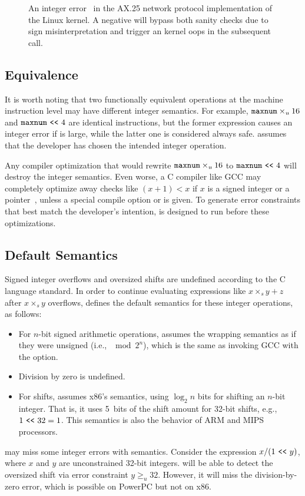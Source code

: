 \begin{figure}
\centering

\vspace{-1em}
\caption{An integer error~\cite[CVE-2009-2909]{cve} in the AX.25
network protocol implementation of the Linux kernel.  A negative
 will bypass both sanity checks due to sign misinterpretation
 and trigger an kernel
oops in the subsequent  call.}
\label{f:ax25-sign}
\end{figure}

\subsection{Equivalence}

It is worth noting that two functionally equivalent operations at
the machine instruction level may have different integer semantics.
For example, $\texttt{maxnum}\times_u 16$ and $\texttt{maxnum} \ \texttt{<}\texttt{<}\  4$ are
identical instructions, but the former expression causes an integer
error if  is large, while the latter one is considered
always safe.  \sys assumes that the developer has chosen the
intended integer operation.

Any compiler optimization that would rewrite
$\texttt{maxnum}\times_u 16$ to $\texttt{maxnum} \ \texttt{<}\texttt{<}\  4$ will destroy the
integer semantics.  Even worse, a C compiler like GCC may completely
optimize away checks like $(x + 1) < x$ if $x$ is a signed integer
or a pointer~\cite{gcc:signed-overflow,us-cert:gcc}, unless a special
compile option  or  is given.
To generate error constraints that best match the developer's
intention, \sys is designed to run before these optimizations.

\subsection{Default Semantics}
\label{s:sema:def}

Signed integer overflows and oversized shifts are undefined according
to the C language standard.  In order to continue evaluating
expressions like $x \times_s y + z$ after $x \times_s y$ overflows,
\sys defines the default semantics for these integer operations, as
follows:
\begin{itemize}
\item
For $n$-bit signed arithmetic operations, \sys assumes the wrapping
semantics as if they were unsigned (i.e., $\mod{2^n}$), which is
the same as invoking GCC with the  option.
\item
Division by zero is undefined.
\item
For shifts, \sys assumes x86's semantics, using $\log_2 n$ bits for
shifting an $n$-bit integer.  That is, it uses 5~bits of the shift
amount for 32-bit shifts, e.g., $1 \ \texttt{<}\texttt{<}\  32 = 1$.  This semantics
is also the behavior of ARM and MIPS processors.
\end{itemize}
\sys may miss some integer errors with  semantics.
Consider the expression $x / (1 \ \texttt{<}\texttt{<}\  y)$, where $x$ and $y$ are
unconstrained 32-bit integers.  \sys will be able to detect the
oversized shift via error constraint $y \geq_u 32$.  However, it
will miss the division-by-zero error, which is possible on PowerPC
but not on x86.

